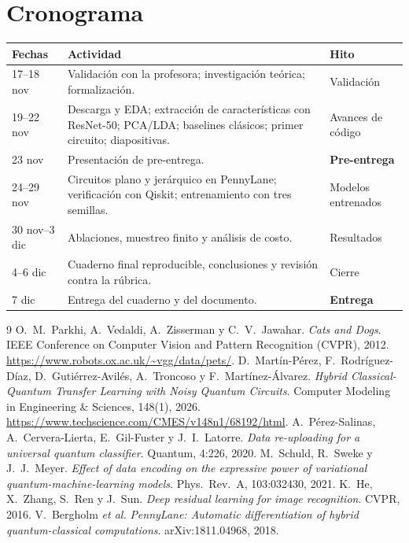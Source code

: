 \documentclass[11pt,letterpaper]{article}
\begin{document}
\section{Cronograma}
\begin{table}[H]
\centering\small
\begin{tabular}{@{}p{3.0cm}p{9.2cm}p{2.3cm}@{}}
\toprule
Fechas & Actividad & Hito \\ \midrule
17--18 nov & Validación con la profesora; investigación teórica; formalización. & Validación \\
19--22 nov & Descarga y EDA; extracción de características con ResNet-50; PCA/LDA; baselines
clásicos; primer circuito; diapositivas. & Avances de código \\
23 nov & Presentación de pre-entrega. & \textbf{Pre-entrega} \\
24--29 nov & Circuitos plano y jerárquico en PennyLane; verificación con Qiskit; entrenamiento con
tres semillas. & Modelos entrenados \\
30 nov--3 dic & Ablaciones, muestreo finito y análisis de costo. & Resultados \\
4--6 dic & Cuaderno final reproducible, conclusiones y revisión contra la rúbrica. & Cierre \\
7 dic & Entrega del cuaderno y del documento. & \textbf{Entrega} \\
\bottomrule
\end{tabular}
\end{table}

\begin{thebibliography}{9}
 O.\ M.\ Parkhi, A.\ Vedaldi, A.\ Zisserman y C.\ V.\ Jawahar. \emph{Cats and
Dogs}. IEEE Conference on Computer Vision and Pattern Recognition (CVPR), 2012.
\url{https://www.robots.ox.ac.uk/~vgg/data/pets/}.
 D.\ Martín-Pérez, F.\ Rodríguez-Díaz, D.\ Gutiérrez-Avilés, A.\ Troncoso y
F.\ Martínez-Álvarez. \emph{Hybrid Classical-Quantum Transfer Learning with Noisy Quantum Circuits}.
Computer Modeling in Engineering \& Sciences, 148(1), 2026.
\url{https://www.techscience.com/CMES/v148n1/68192/html}.
 A.\ Pérez-Salinas, A.\ Cervera-Lierta, E.\ Gil-Fuster y J.\ I.\ Latorre.
\emph{Data re-uploading for a universal quantum classifier}. Quantum, 4:226, 2020.
 M.\ Schuld, R.\ Sweke y J.\ J.\ Meyer. \emph{Effect of data encoding on the
expressive power of variational quantum-machine-learning models}. Phys.\ Rev.\ A, 103:032430, 2021.
 K.\ He, X.\ Zhang, S.\ Ren y J.\ Sun. \emph{Deep residual learning for image
recognition}. CVPR, 2016.
 V.\ Bergholm \emph{et al.} \emph{PennyLane: Automatic differentiation of hybrid
quantum-classical computations}. arXiv:1811.04968, 2018.
\end{thebibliography}
\end{document}

